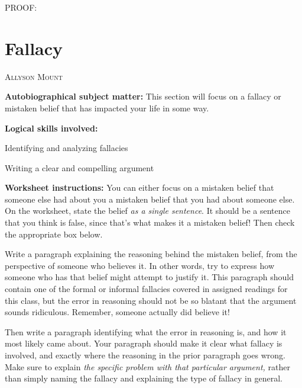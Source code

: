 \documentclass[oneside, openany]{book} %
\makeatletter
\newcommand\chapterauthor[1]{\authortoc{#1}\printchapterauthor{#1}}
\newcommand{\printchapterauthor}[1]{%
 {\parindent0pt\vspace*{-25pt}%
 \linespread{1.1}\large\scshape#1%
 \par\nobreak\vspace*{35pt}}
 \@afterheading%
}
\newcommand{\authortoc}[1]{%
 \addtocontents{toc}{\vskip-10pt}%
 \addtocontents{toc}{%
  \protect\contentsline{chapter}%
  {\hskip1.3em\mdseries\scshape\protect\scriptsize#1}{}{}}
 \addtocontents{toc}{\vskip5pt}%
}
\makeatother
\begin{document}
\noindent 

\noindent 

\noindent 

\noindent PROOF:

\noindent 

\noindent 

\noindent 

\chapter{Fallacy}
\chapterauthor{Allyson Mount}


\noindent \textbf{Autobiographical subject matter: }This section will focus on a fallacy or mistaken belief that has impacted your life in some way.

\noindent 

\noindent \textbf{Logical skills involved:}

\noindent 

\noindent  Identifying and analyzing fallacies

\noindent 

\noindent  Writing a clear and compelling argument

\noindent 

\noindent 

\noindent \textbf{Worksheet instructions: }You can either focus on a mistaken belief that someone else had about you  a mistaken belief that you had about someone else. On the worksheet, state the belief \textit{as a single sentence}. It should be a sentence that you think is false, since that's what makes it a mistaken belief! Then check the appropriate box below.

\noindent 

\noindent Write a paragraph explaining the reasoning behind the mistaken belief, from the perspective of someone who believes it. In other words, try to express how someone who has that belief might attempt to justify it. This paragraph should contain one of the formal or informal fallacies covered in assigned readings for this class, but the error in reasoning should not be so blatant that the argument sounds ridiculous. Remember, someone actually did believe it!

\noindent 

\noindent Then write a paragraph identifying what the error in reasoning is, and how it most likely came about. Your paragraph should make it clear what fallacy is involved, and exactly where the reasoning in the prior paragraph goes wrong. Make sure to explain \textit{the specific problem with that particular argument, }rather than simply naming the fallacy and explaining the type of fallacy in general.
\end{document}
